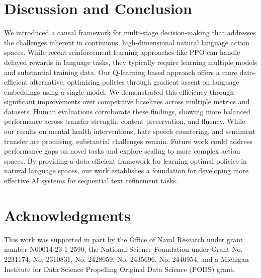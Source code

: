 \documentclass{article}
\begin{document}
\section{Discussion and Conclusion}
We introduced a causal framework for multi-stage decision-making that addresses the challenges inherent in continuous, high-dimensional natural language action spaces. While recent reinforcement learning approaches like PPO can handle delayed rewards in language tasks, they typically require learning multiple models and substantial training data. Our Q-learning based approach offers a more data-efficient alternative, optimizing policies through gradient ascent on language embeddings using a single model. We demonstrated this efficiency through significant improvements over competitive baselines across multiple metrics and datasets. Human evaluations corroborate these findings, showing more balanced performance across transfer strength, content preservation, and fluency. While our results on mental health interventions, hate speech countering, and sentiment transfer are promising, substantial challenges remain. Future work could address performance gaps on novel tasks and explore scaling to more complex action spaces. By providing a data-efficient framework for learning optimal policies in natural language spaces, our work establishes a foundation for developing more effective AI systems for sequential text refinement tasks.

\section*{Acknowledgments} This work was supported in part by the Office of Naval Research under grant number N00014-23-1-2590, the National Science Foundation under Grant No. 2231174, No. 2310831, No. 2428059, No. 2435696, No. 2440954, and a Michigan Institute for Data Science Propelling Original Data Science (PODS) grant.


 


\newpage
\appendix
\end{document}
